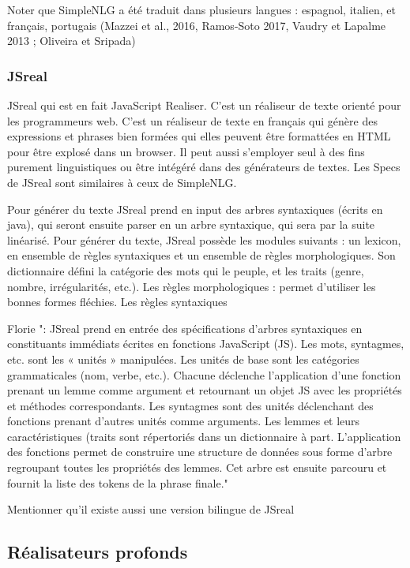 Noter que SimpleNLG a été traduit dans plusieurs langues : espagnol, italien, et français, portugais (Mazzei et al., 2016, Ramos-Soto 2017, Vaudry et Lapalme 2013 ; Oliveira et Sripada)

\subsubsection{JSreal} \citep{DaoustJSREALTextRealizer2015}

JSreal qui est en fait JavaScript Realiser. C'est un réaliseur de texte orienté pour les programmeurs web. C'est un réaliseur de texte en français qui génère des expressions et phrases bien formées qui elles peuvent être formattées en HTML pour être explosé dans un browser. Il peut aussi s'employer seul à des fins purement linguistiques ou être intégéré dans des générateurs de textes. Les Specs de JSreal sont similaires à ceux de SimpleNLG.

Pour générer du texte JSreal prend en input des arbres syntaxiques (écrits en java), qui seront ensuite parser en un arbre syntaxique, qui sera par la suite linéarisé. Pour générer du texte, JSreal possède les modules suivants : un lexicon, en ensemble de règles syntaxiques et un ensemble de règles morphologiques. Son dictionnaire défini la catégorie des mots qui le peuple, et les traits (genre, nombre, irrégularités, etc.). Les règles morphologiques : permet d'utiliser les bonnes formes fléchies. Les règles syntaxiques 

Florie ": JSreal prend en entrée des spécifications d'arbres syntaxiques en constituants immédiats écrites en fonctions JavaScript (JS). Les mots, syntagmes, etc. sont les « unités » manipulées. Les unités de base sont les catégories grammaticales (nom, verbe, etc.). Chacune déclenche l'application d'une fonction prenant un lemme comme argument et retournant un objet JS avec les propriétés et méthodes correspondants. Les syntagmes sont des unités déclenchant des fonctions prenant d'autres unités comme arguments. Les lemmes et leurs caractéristiques (traits sont répertoriés dans un dictionnaire à part. L'application des fonctions permet de construire une structure de données sous forme d'arbre regroupant toutes les propriétés des lemmes. Cet arbre est ensuite parcouru et fournit la liste des tokens de la phrase finale."

Mentionner qu'il existe aussi une version bilingue de JSreal \citep{MolinsJSrealBBilingualText2015}

\subsection{Réalisateurs profonds}

